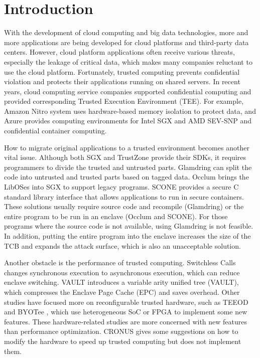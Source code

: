 \section{Introduction}
With the development of cloud computing and big data technologies,
more and more applications are being developed for cloud platforms
and third-party data centers. However, cloud platform applications
often receive various threats, especially the leakage of critical data,
which makes many companies reluctant to use the cloud platform.
Fortunately, trusted computing prevents confidential violation and
protects their applications running on shared servers.
In recent years, cloud computing service companies supported confidential
computing and provided corresponding Trusted Execution Environment (TEE).
For example, Amazon Nitro system \cite{AmazonNitro} uses hardware-based memory
isolation to protect data, and Azure \cite{AzureDocs} provides computing environments
for Intel SGX and AMD SEV-SNP and confidential container computing.

How to migrate original applications to a trusted environment becomes another
vital issue. Although both SGX and TrustZone provide their SDKs,
it requires programmers to divide the trusted and untrusted parts.
Glamdring \cite{Lind2017GlamdringAA} can split the code into untrusted and
trusted parts based on tagged data. Occlum \cite{Shen2020OcclumSA} brings
the LibOSes into SGX to support legacy programs. SCONE \cite{Arnautov2016SCONESL}
provides a secure C standard library interface that allows applications to
run in secure containers.
These solutions usually require source code and recompile (Glamdring) or
the entire program to be run in an enclave (Occlum and SCONE).
For those programs where the source code is not available,
using Glamdring is not feasible.
In addition, putting the entire program into the enclave increases
the size of the TCB and expands the attack surface,
which is also an unacceptable solution.

Another obstacle is the performance of trusted computing.
Switchless Calls \cite{Tian2018SwitchlessCM} changes synchronous execution
to asynchronous execution, which can reduce enclave switching.
VAULT \cite{Taassori2018VAULTRP} introduces a variable arity unified tree (VAULT),
which compresses the Enclave Page Cache (EPC) and saves overhead.
Other studies have focused more on reconfigurable trusted hardware,
such as TEEOD \cite{Pereira2021TowardsAT} and BYOTee \cite{Armanuzzaman2022BYOTeeTB},
which use heterogeneous SoC or FPGA to implement some new features.
These hardware-related studies are more concerned with new features than
performance optimization. CRONUS \cite{Jiang2022CRONUSFS} gives some suggestions
on how to modify the hardware to speed up trusted computing but does not
implement them.

